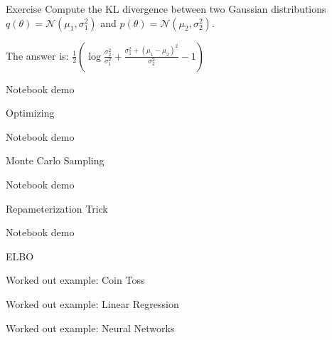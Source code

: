 \documentclass[handout]{beamer}
\begin{document}
\begin{frame}{Exercise}
    Compute the KL divergence between two Gaussian distributions $q(\theta) = \mathcal{N}(\mu_1, \sigma_1^2)$ and $p(\theta) = \mathcal{N}(\mu_2, \sigma_2^2)$.

    \pause The answer is: $\frac{1}{2} \left( \log \frac{\sigma_2^2}{\sigma_1^2} + \frac{\sigma_1^2 + (\mu_1 - \mu_2)^2}{\sigma_2^2} - 1 \right)$
    
\end{frame}

\begin{frame}
    Notebook demo
\end{frame}

\begin{frame}{Optimizing}
    
\end{frame}

\begin{frame}
    Notebook demo
\end{frame}

\begin{frame}{Monte Carlo Sampling}
    
\end{frame}

\begin{frame}
    Notebook demo
\end{frame}

\begin{frame}{Repameterization Trick}
    
\end{frame}

\begin{frame}
    Notebook demo
\end{frame}

\begin{frame}{ELBO}
\end{frame}
    
\begin{frame}{Worked out example: Coin Toss}
   
\end{frame}

\begin{frame}{Worked out example: Linear Regression}
    
\end{frame}

\begin{frame}{Worked out example: Neural Networks}
\end{frame}

    
\end{document}
